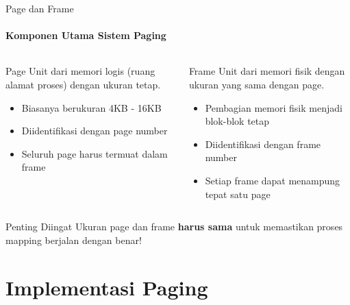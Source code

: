 \documentclass[10pt,aspectratio=169]{beamer}
\begin{document}
\begin{frame}{Page dan Frame}
    \framesubtitle{Komponen Utama Sistem Paging}
    
    \begin{columns}[T]
            \begin{block}{Page}
                Unit dari memori logis (ruang alamat proses) dengan ukuran tetap.
                \begin{itemize}
                    \item Biasanya berukuran 4KB - 16KB
                    \item Diidentifikasi dengan page number
                    \item Seluruh page harus termuat dalam frame
                \end{itemize}
            \end{block}
            
            \begin{block}{Frame}
                Unit dari memori fisik dengan ukuran yang sama dengan page.
                \begin{itemize}
                    \item Pembagian memori fisik menjadi blok-blok tetap
                    \item Diidentifikasi dengan frame number
                    \item Setiap frame dapat menampung tepat satu page
                \end{itemize}
            \end{block}
    \end{columns}
    
    \begin{alertblock}{Penting Diingat}
        Ukuran page dan frame \textbf{harus sama} untuk memastikan proses mapping berjalan dengan benar!
    \end{alertblock}
\end{frame}

\section{Implementasi Paging}
\end{document}
